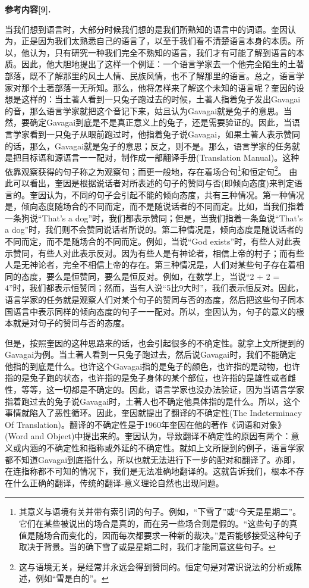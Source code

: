\documentclass{article}
\begin{document}
\textbf{\kaishu 参考内容[9].}
{当我们想到语言时，大部分时候我们想的是我们所熟知的语言中的词语。奎因认为，正是因为我们太熟悉自己的语言了，以至于我们看不清楚语言本身的本质。所以，他认为，只有研究一种我们完全不熟知的语言，我们才有可能了解到语言的本质。因此，他大胆地提出了这样一个例证：一个语言学家去一个他完全陌生的土著部落，既不了解那里的风土人情、民族风情，也不了解那里的语言。总之，语言学家对那个土著部落一无所知。那么，他将怎样来了解这个未知的语言呢？奎因的设想是这样的：当土著人看到一只兔子跑过去的时候，土著人指着兔子发出Gavagai的音，那么语言学家就把这个音记下来，姑且认为Gavagai就是兔子的意思。当然，要确定Gavagai到底是不是真正意义上的兔子，还是需要验证的。因此，当语言学家看到一只兔子从眼前跑过时，他指着兔子说Gavagai，如果土著人表示赞同的话，那么，Gavagai就是兔子的意思；反之，则不是。那么，语言学家的任务就是把目标语和源语言一一配对，制作成一部翻译手册(Translation Manual)。这种依靠观察获得的句子称之为观察句；而更一般地，存在着场合句\footnote{其意义与语境有关并带有索引词的句子。例如，“下雪了”或“今天是星期二”。它们在某些被说出的场合是真的，而在另一些场合则是假的。“这些句子的真值是随场合而变化的，因而每次都要求一种新的裁决。”是否能够接受这种句子取决于背景。当的确下雪了或是星期二时，我们才能同意这些句子。}和恒定句\footnote{这与语境无关，是经常并永远会得到赞同的。恒定句是对常识说法的分析或陈述，例如“雪是白的”。}。
由此可以看出，奎因是根据说话者对所表述的句子的赞同与否(即倾向态度)来判定语言的。奎因认为，不同的句子会引起不能的倾向态度，共有三种情况。第一种情况是，倾向态度随场合的不同而定，而不是随说话者的不同而定。比如，当我们指着一条狗说“That's a dog”时，我们都表示赞同；但是，当我们指着一条鱼说“That's a dog”时，我们则不会赞同说话者所说的。第二种情况是，倾向态度是随说话者的不同而定，而不是随场合的不同而定。例如，当说“God exists”时，有些人对此表示赞同，有些人对此表示反对。因为有些人是有神论者，相信上帝的村子；而有些人是无神论者，完全不相信上帝的存在。第三种情况是，人们对某些句子存在着相同的态度，要么是恒赞同，要么是恒反对。例如，在数学上，当说“2 + 2 = 4”时，我们都表示恒赞同；然而，当有人说“5比9大时”，我们表示恒反对。因此，语言学家的任务就是观察人们对某个句子的赞同与否的态度，然后把这些句子同本国语言中表示同样的倾向态度的句子一一配对。所以，奎因认为，句子的意义的根本就是对句子的赞同与否的态度。

但是，按照奎因的这种思路来的话，也会引起很多的不确定性。就拿上文所提到的Gavagai为例。当土著人看到一只兔子跑过去，然后说Gavagai时，我们不能确定他指的到底是什么。也许这个Gavagai指的是兔子的颜色，也许指的是动物，也许指的是兔子跑的状态，也许指的是兔子身体的某个部位，也许指的是雄性或者雌性，等等，这一切都是不确定的。因此，语言学家也没办法验证，因为当语言学家指着跑过去的兔子说Gavagai时，土著人也不确定他具体指的是什么。所以，这个事情就陷入了恶性循环。因此，奎因就提出了翻译的不确定性(The Indeterminacy Of Translation)。翻译的不确定性是于1960年奎因在他的著作《词语和对象》(Word and Object)中提出来的。奎因认为，导致翻译不确定性的原因有两个：意义或内涵的不确定性和指称或外延的不确定性。就如上文所提到的例子，语言学家都不知道Gavagai到底指什么，所以也就无法进行下一步的配对和翻译了。亦即，在连指称都不可知的情况下，我们是无法准确地翻译的。这就告诉我们，根本不存在什么正确的翻译，传统的翻译-意义理论自然也出现问题。}
\end{document}
